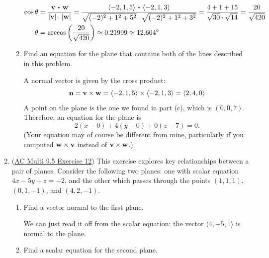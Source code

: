 \begin{enumerate}[leftmargin=0pt]
\begin{enumerate}
	\begin{red}
		\begin{align*}
			\cos\theta &= \dfrac{\vv \dotp \vw}{|\vv|\cdot|\vw|}
			= \dfrac{\langle -2, 1, 5 \rangle \dotp \langle -2, 1, 3 \rangle}{\sqrt{(-2)^2 + 1^2 + 5^2} \cdot \sqrt{(-2)^2 + 1^2 + 3^2}} = \dfrac{4 + 1 + 15}{\sqrt{30} \cdot \sqrt{14}} = \dfrac{20}{\sqrt{420}} \\
			\theta &= \arccos\left(\dfrac{20}{\sqrt{420}}\right)\approx 0.21999 \approx 12.604^\circ 
		\end{align*}
	\end{red}
	\item Find an equation for the plane that contains both of the lines described in this problem.
	
	\begin{red}
		A normal vector is given by the cross product:
		\[\mathbf{n} = \mathbf{v}\times\mathbf{w} =  \langle -2, 1, 5 \rangle \times \langle -2, 1, 3 \rangle = \langle 2, 4, 0 \rangle\]
		A point on the plane is the one we found in part (c), which is $(0, 0, 7)$. Therefore, an equation for the plane is 
		\[ 2(x-0) + 4(y-0) + 0(z-7) = 0. \]
		(Your equation may of course be different from mine, particularly if you computed $\mathbf{w}\times\mathbf{v}$ instead of $\mathbf{v}\times\mathbf{w}$.)
	\end{red}
\end{enumerate}

\item (\href{https://activecalculus.org/multi/S-9-5-Lines-Planes.html#Ez_9_5_3}{AC Multi 9.5 Exercise 12}) This exercise explores key relationships between a pair of planes. Consider the following two planes: one with scalar equation $4x-5y+z = -2$, and the other which passes through the points $(1,1,1)$, $(0, 1, -1)$, and $(4, 2, -1)$.
\begin{enumerate}
	\item Find a vector normal to the first plane.
	
	\begin{red}
		We can just read it off from the scalar equation: the vector $\langle 4, -5, 1\rangle$ is normal to the plane.
	\end{red}
	\item Find a scalar equation for the second plane.
	

\end{enumerate}
\end{enumerate}
